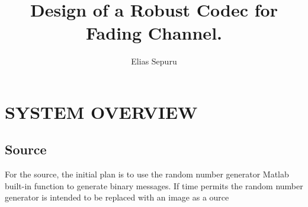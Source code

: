 \documentclass[]{article}
\title{Design of a Robust Codec for Fading Channel.}
\author{Elias Sepuru}
\begin{document}
\maketitle



\section*{SYSTEM OVERVIEW}

\subsection*{Source}
For the source, the initial plan is to use the random number generator Matlab built-in function to generate binary messages. If time permits the random number generator is intended to be replaced with an image as a ource
\end{document}

